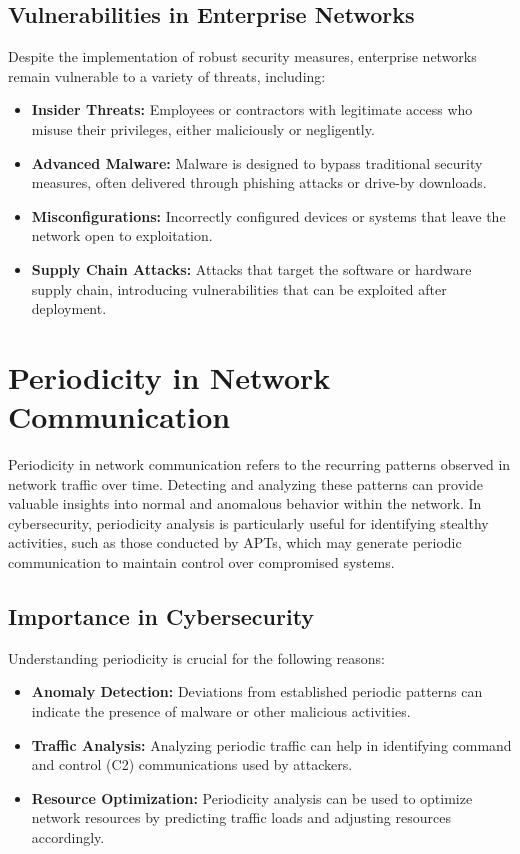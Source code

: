 \subsection{Vulnerabilities in Enterprise Networks}

Despite the implementation of robust security measures, enterprise networks remain vulnerable to a variety of threats, including:

\begin{itemize}
    \item \textbf{Insider Threats:} Employees or contractors with legitimate access who misuse their privileges, either maliciously or negligently.
    \item \textbf{Advanced Malware:} Malware is designed to bypass traditional security measures, often delivered through phishing attacks or drive-by downloads.
    \item \textbf{Misconfigurations:} Incorrectly configured devices or systems that leave the network open to exploitation.
    \item \textbf{Supply Chain Attacks:} Attacks that target the software or hardware supply chain, introducing vulnerabilities that can be exploited after deployment.
\end{itemize}

\section{Periodicity in Network Communication}

Periodicity in network communication refers to the recurring patterns observed in network traffic over time. Detecting and analyzing these patterns can provide valuable insights into normal and anomalous behavior within the network. In cybersecurity, periodicity analysis is particularly useful for identifying stealthy activities, such as those conducted by APTs, which may generate periodic communication to maintain control over compromised systems.

\subsection{Importance in Cybersecurity}

Understanding periodicity is crucial for the following reasons:

\begin{itemize}
    \item \textbf{Anomaly Detection:} Deviations from established periodic patterns can indicate the presence of malware or other malicious activities.
    \item \textbf{Traffic Analysis:} Analyzing periodic traffic can help in identifying command and control (C2) communications used by attackers.
    \item \textbf{Resource Optimization:} Periodicity analysis can be used to optimize network resources by predicting traffic loads and adjusting resources accordingly.
\end{itemize}

